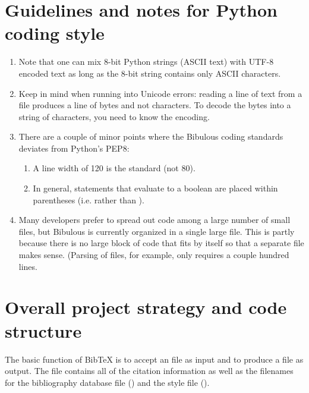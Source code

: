\documentclass[letterpaper,10pt,english]{sphinxmanual}
\begin{document}
\section{Guidelines and notes for Python coding style}
\label{developer_guide:guidelines-and-notes-for-python-coding-style}\begin{enumerate}
\item {} 
Note that one can mix 8-bit Python strings (ASCII text) with UTF-8 encoded text as long as the 8-bit string contains only ASCII characters.

\item {} 
Keep in mind when running into Unicode errors: reading a line of text from a file produces a line of bytes and not characters. To decode the bytes into a string of characters, you need to know the encoding.

\item {} 
There are a couple of minor points where the Bibulous coding standards deviates from Python's PEP8:
\begin{enumerate}
\item {} 
A line width of 120 is the standard (not 80).

\item {} 
In general, statements that evaluate to a boolean are placed within parentheses (i.e.  rather than ).

\end{enumerate}

\item {} 
Many developers prefer to spread out code among a large number of small files, but Bibulous is currently organized in a single large file. This is partly because there is no large block of code that fits by itself so that a separate file makes sense. (Parsing of  files, for example, only requires a couple hundred lines.

\end{enumerate}


\section{Overall project strategy and code structure}
\label{developer_guide:overall-project-strategy-and-code-structure}
The basic function of BibTeX is to accept an  file as input and to produce a  file as output. The  file contains all of the citation information as well as the filenames for the bibliography database file () and the style file ().
\end{document}

